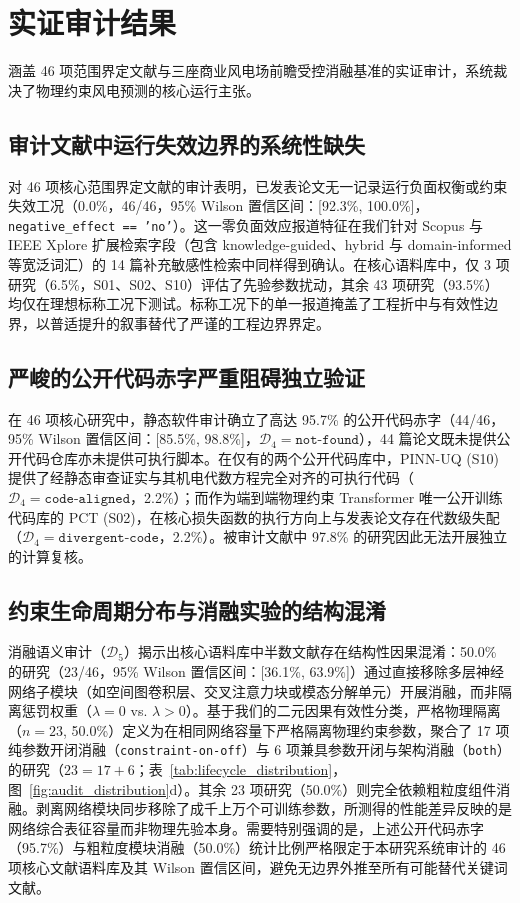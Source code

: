 \section{实证审计结果}
\label{sec:results}

涵盖 46 项范围界定文献与三座商业风电场前瞻受控消融基准的实证审计，系统裁决了物理约束风电预测的核心运行主张。

\subsection{审计文献中运行失效边界的系统性缺失}
对 46 项核心范围界定文献的审计表明，已发表论文无一记录运行负面权衡或约束失效工况（0.0\%，46/46，95\% Wilson 置信区间：[92.3\%, 100.0\%]，\texttt{negative\_effect == 'no'}）。这一零负面效应报道特征在我们针对 Scopus 与 IEEE Xplore 扩展检索字段（包含 knowledge-guided、hybrid 与 domain-informed 等宽泛词汇）的 14 篇补充敏感性检索中同样得到确认。在核心语料库中，仅 3 项研究（6.5\%，S01、S02、S10）评估了先验参数扰动，其余 43 项研究（93.5\%）均仅在理想标称工况下测试。标称工况下的单一报道掩盖了工程折中与有效性边界，以普适提升的叙事替代了严谨的工程边界界定。

\subsection{严峻的公开代码赤字严重阻碍独立验证}
在 46 项核心研究中，静态软件审计确立了高达 95.7\% 的公开代码赤字（44/46，95\% Wilson 置信区间：[85.5\%, 98.8\%]，$\mathcal{D}_4 = \texttt{not-found}$），44 篇论文既未提供公开代码仓库亦未提供可执行脚本。在仅有的两个公开代码库中，PINN-UQ (S10) 提供了经静态审查证实与其机电代数方程完全对齐的可执行代码（$\mathcal{D}_4 = \texttt{code-aligned}$，2.2\%）；而作为端到端物理约束 Transformer 唯一公开训练代码库的 PCT (S02)，在核心损失函数的执行方向上与发表论文存在代数级失配（$\mathcal{D}_4 = \texttt{divergent-code}$，2.2\%）。被审计文献中 97.8\% 的研究因此无法开展独立的计算复核。

\subsection{约束生命周期分布与消融实验的结构混淆}
消融语义审计（$\mathcal{D}_5$）揭示出核心语料库中半数文献存在结构性因果混淆：50.0\% 的研究（23/46，95\% Wilson 置信区间：[36.1\%, 63.9\%]）通过直接移除多层神经网络子模块（如空间图卷积层、交叉注意力块或模态分解单元）开展消融，而非隔离惩罚权重（$\lambda=0$ vs. $\lambda>0$）。基于我们的二元因果有效性分类，严格物理隔离（$n=23$, 50.0\%）定义为在相同网络容量下严格隔离物理约束参数，聚合了 17 项纯参数开闭消融（\texttt{constraint-on-off}）与 6 项兼具参数开闭与架构消融（\texttt{both}）的研究（$23 = 17 + 6$；表~\ref{tab:lifecycle_distribution}，图~\ref{fig:audit_distribution}d）。其余 23 项研究（50.0\%）则完全依赖粗粒度组件消融。剥离网络模块同步移除了成千上万个可训练参数，所测得的性能差异反映的是网络综合表征容量而非物理先验本身。需要特别强调的是，上述公开代码赤字（95.7\%）与粗粒度模块消融（50.0\%）统计比例严格限定于本研究系统审计的 46 项核心文献语料库及其 Wilson 置信区间，避免无边界外推至所有可能替代关键词文献。

